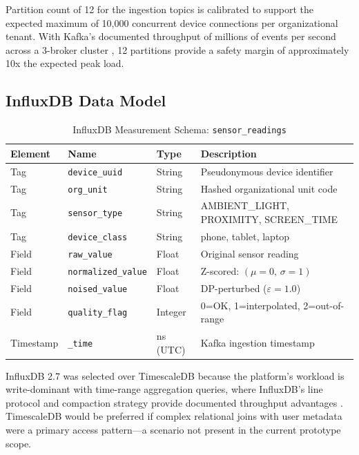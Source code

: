 \documentclass[conference]{IEEEtran}
\begin{document}
Partition count of 12 for the ingestion topics is calibrated to support the expected
maximum of 10,000 concurrent device connections per organizational tenant. With Kafka's
documented throughput of millions of events per second across a 3-broker cluster
\cite{b10}, 12 partitions provide a safety margin of approximately 10x the expected
peak load.

\subsection{InfluxDB Data Model}

\begin{table}[H]
  \centering
  \caption{InfluxDB Measurement Schema: \texttt{sensor\_readings}}
  \label{tab:influx}
  \begin{tabularx}{\textwidth}{p{2.5cm} p{3.5cm} p{2cm} X}
    \toprule
    \textbf{Element} & \textbf{Name} & \textbf{Type} & \textbf{Description} \\
    \midrule
    Tag & \texttt{device\_uuid}  & String & Pseudonymous device identifier \\
    Tag & \texttt{org\_unit}     & String & Hashed organizational unit code \\
    Tag & \texttt{sensor\_type}  & String & AMBIENT\_LIGHT, PROXIMITY, SCREEN\_TIME \\
    Tag & \texttt{device\_class} & String & phone, tablet, laptop \\
    \midrule
    Field & \texttt{raw\_value}        & Float   & Original sensor reading \\
    Field & \texttt{normalized\_value} & Float   & Z-scored: $(\mu=0,\,\sigma=1)$ \\
    Field & \texttt{noised\_value}     & Float   & DP-perturbed ($\varepsilon=1.0$) \\
    Field & \texttt{quality\_flag}     & Integer & 0=OK, 1=interpolated, 2=out-of-range \\
    \midrule
    Timestamp & \texttt{\_time} & ns (UTC) & Kafka ingestion timestamp \\
    \bottomrule
  \end{tabularx}
\end{table}

InfluxDB 2.7 was selected over TimescaleDB because the platform's workload is
write-dominant with time-range aggregation queries, where InfluxDB's line protocol and
compaction strategy provide documented throughput advantages \cite{b7}. TimescaleDB
would be preferred if complex relational joins with user metadata were a primary access
pattern---a scenario not present in the current prototype scope.
\end{document}
